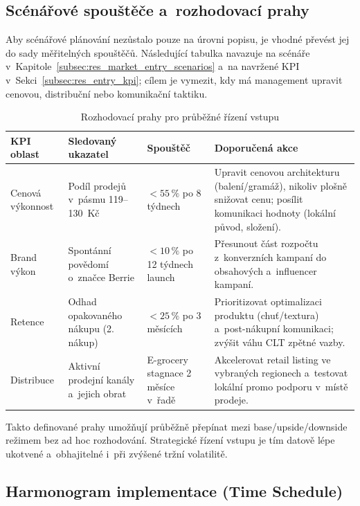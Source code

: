 \subsection{Scénářové spouštěče a~rozhodovací prahy}
\label{subsec:res_scenario_triggers}

Aby scénářové plánování nezůstalo pouze na úrovni popisu, je vhodné převést jej do sady měřitelných spouštěčů. Následující tabulka navazuje na scénáře v~Kapitole~\ref{subsec:res_market_entry_scenarios} a~na navržené KPI v~Sekci~\ref{subsec:res_entry_kpi}; cílem je vymezit, kdy má management upravit cenovou, distribuční nebo komunikační taktiku.

\begin{table}[H]
\centering
\caption{Rozhodovací prahy pro průběžné řízení vstupu}
\label{tab:scenario_triggers}
\small
\begin{tabularx}{\textwidth}{>{\raggedright\arraybackslash}p{3.8cm} >{\raggedright\arraybackslash}p{3.4cm} >{\raggedright\arraybackslash}p{2.3cm} >{\raggedright\arraybackslash}X}
\toprule
\textbf{KPI oblast} & \textbf{Sledovaný ukazatel} & \textbf{Spouštěč} & \textbf{Doporučená akce} \\
\midrule
Cenová výkonnost & Podíl prodejů v~pásmu 119--130~Kč & $< 55\,\%$ po 8 týdnech & Upravit cenovou architekturu (balení/gramáž), nikoliv plošně snižovat cenu; posílit komunikaci hodnoty (lokální původ, složení). \\
\midrule
Brand výkon & Spontánní povědomí o~značce Berrie & $< 10\,\%$ po 12 týdnech launch & Přesunout část rozpočtu z~konverzních kampaní do obsahových a~influencer kampaní. \\
\midrule
Retence & Odhad opakovaného nákupu (2. nákup) & $< 25\,\%$ po 3 měsících & Prioritizovat optimalizaci produktu (chuť/textura) a~post-nákupní komunikaci; zvýšit váhu CLT zpětné vazby. \\
\midrule
Distribuce & Aktivní prodejní kanály a~jejich obrat & E-grocery stagnace 2 měsíce v~řadě & Akcelerovat retail listing ve vybraných regionech a~testovat lokální promo podporu v~místě prodeje. \\
\bottomrule
\end{tabularx}
\normalsize
\end{table}

Takto definované prahy umožňují průběžně přepínat mezi base/upside/downside režimem bez ad hoc rozhodování. Strategické řízení vstupu je tím datově lépe ukotvené a~obhajitelné i~při zvýšené tržní volatilitě.

\subsection{Harmonogram implementace (Time Schedule)}
\label{subsec:res_timeline}

